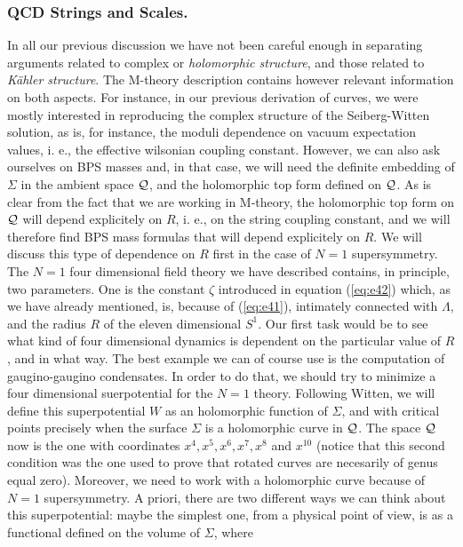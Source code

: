 \subsubsection{QCD Strings and Scales.}

In all our previous discussion we have not been careful enough in
separating arguments related to complex or {\em holomorphic
structure}, and those related to {\em K\"ahler structure}. The
M-theory description contains however relevant information on
both aspects. For instance, in our previous derivation of curves,
we were mostly interested in reproducing the complex structure of the Seiberg-Witten 
solution, as is, for instance, the moduli dependence on vacuum
expectation values, i. e., the effective wilsonian coupling
constant. However, we can also ask ourselves on BPS masses and,
in that case, we will need the definite embedding of $\Sigma$ in
the ambient space ${\cal Q}$, and the holomorphic top form
defined on ${\cal Q}$. As is clear from the fact that we
are working in M-theory, the holomorphic top form on ${\cal Q}$
will depend explicitely on $R$, i. e., on the string coupling
constant, and we will therefore find BPS mass formulas that will
depend explicitely on $R$. We will discuss this type of
dependence on $R$ first in the case of $N=1$ supersymmetry. The
$N=1$ four dimensional field theory we have described contains,
in principle, two parameters. One is the constant $\zeta$
introduced in equation (\ref{eq:e42}) which, as we have already
mentioned, is, because of (\ref{eq:e41}), intimately connected
with $\Lambda$, and the radius $R$ of the eleven dimensional
$S^1$. Our first task would be to see what kind of four
dimensional dynamics is dependent on the particular value of $R$,
and in what way. The best example we can of course use is the
computation of gaugino-gaugino condensates. In order to do that,
we should try to minimize a four dimensional suerpotential for the $N=1$
theory. Following Witten, we will define this superpotential $W$
as an holomorphic function of $\Sigma$, and with critical points
precisely when the surface $\Sigma$ is a holomorphic curve in
${\cal Q}$. The space ${\cal Q}$ now is the one with coordinates
$x^4,x^5,x^6,x^7,x^8$ and $x^{10}$ (notice that this second
condition was the one used to prove that rotated curves are
necesarily of genus equal zero). Moreover, we need to work 
with a holomorphic curve because of $N=1$ supersymmetry. A
priori, there are two different ways we can think about this
superpotential: maybe the simplest one, from a physical point of
view, is as a functional defined on the volume of $\Sigma$, where
